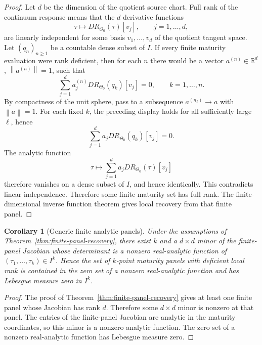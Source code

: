\documentclass[11pt,a4paper]{amsart}
\theoremstyle{plain}
\newtheorem{corollary}[theorem]{Corollary}
\theoremstyle{definition}
\theoremstyle{remark}
\newcommand{\R}{\mathbb{R}}
\newcommand{\norm}[1]{\left\lVert #1\right\rVert}
\begin{document}
\begin{proof}
Let \(d\) be the dimension of the quotient source chart.  Full rank of the continuum response
means that the \(d\) derivative functions
\[
        \tau\mapsto D R_{\Theta_0}(\tau)[v_j],
        \qquad j=1,\dots,d,
\]
are linearly independent for some basis \(v_1,\dots,v_d\) of the quotient tangent space.  Let
\((q_n)_{n\ge1}\) be a countable dense subset of \(I\).  If every finite maturity evaluation were
rank deficient, then for each \(n\) there would be a vector \(a^{(n)}\in\R^d\), \(\norm{a^{(n)}}=1\),
such that
\[
        \sum_{j=1}^d
        a_j^{(n)}D R_{\Theta_0}(q_k)[v_j]
        =
        0,
        \qquad k=1,\dots,n.
\]
By compactness of the unit sphere, pass to a subsequence \(a^{(n_\ell)}\to a\) with
\(\norm a=1\).  For each fixed \(k\), the preceding display holds for all sufficiently large
\(\ell\), hence
\[
        \sum_{j=1}^d a_jD R_{\Theta_0}(q_k)[v_j]=0.
\]
The analytic function
\[
        \tau\mapsto
        \sum_{j=1}^d a_jD R_{\Theta_0}(\tau)[v_j]
\]
therefore vanishes on a dense subset of \(I\), and hence identically.  This contradicts linear
independence.  Therefore some finite maturity set has full rank.  The finite-dimensional inverse
function theorem gives local recovery from that finite panel.
\end{proof}

\begin{corollary}[Generic finite analytic panels]\label{cor:generic-finite-panel}
Under the assumptions of Theorem~\ref{thm:finite-panel-recovery}, there exist \(k\) and a
\(d\times d\) minor of the finite-panel Jacobian whose determinant is a nonzero real-analytic
function of \((\tau_1,\dots,\tau_k)\in I^k\).  Hence the set of \(k\)-point maturity panels with
deficient local rank is contained in the zero set of a nonzero real-analytic function and has
Lebesgue measure zero in \(I^k\).
\end{corollary}

\begin{proof}
The proof of Theorem~\ref{thm:finite-panel-recovery} gives at least one finite panel whose
Jacobian has rank \(d\).  Therefore some \(d\times d\) minor is nonzero at that panel.  The
entries of the finite-panel Jacobian are analytic in the maturity coordinates, so this minor is a
nonzero analytic function.  The zero set of a nonzero real-analytic function has Lebesgue measure
zero.
\end{proof}
\end{document}
